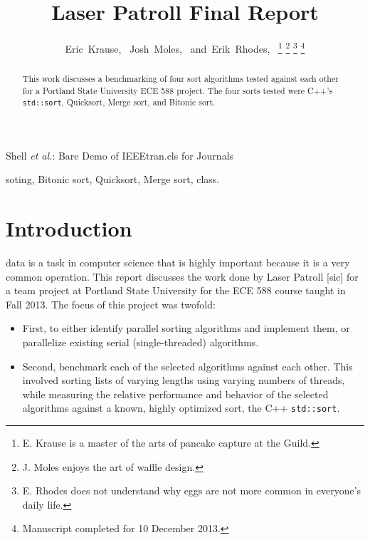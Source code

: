 \documentclass[journal]{IEEEtran}
\begin{document}
\title{Laser Patroll Final Report}


\author{Eric~Krause,~
        Josh~Moles,~
        and~Erik~Rhodes,~%
\thanks{E. Krause is a master of the arts of pancake capture at the Guild.}%
\thanks{J. Moles enjoys the art of waffle design.}%
\thanks{E. Rhodes does not understand why eggs are not more common in everyone's daily life.}%
\thanks{Manuscript completed for 10 December 2013.}}


%
{Shell \MakeLowercase{\textit{et al.}}: Bare Demo of IEEEtran.cls for Journals}



\maketitle


\begin{abstract}
This work discusses a benchmarking of four sort algorithms tested against each other for a Portland State University ECE 588 project. The four sorts tested were C++'s \texttt{std::sort}, Quicksort, Merge sort, and Bitonic sort.
\end{abstract}

\begin{IEEEkeywords}
soting, Bitonic sort, Quicksort, Merge sort, class.
\end{IEEEkeywords}

\IEEEpeerreviewmaketitle



\section{Introduction}
 data is a task in computer science that is highly important because it is a very common operation. This report discusses the work done by Laser Patroll [sic] for a team project at Portland State University for the ECE 588 course taught in Fall 2013. The focus of this project was twofold: 
\begin{itemize}
\item First, to either identify parallel sorting algorithms and implement them, or parallelize existing serial (single-threaded) algorithms. 
\item Second, benchmark each of the selected algorithms against each other.  This involved sorting lists of varying lengths using varying numbers of threads, while measuring the relative performance and behavior of the selected algorithms against a known, highly optimized sort, the C++ \texttt{std::sort}.
\end{itemize}
\end{document}
